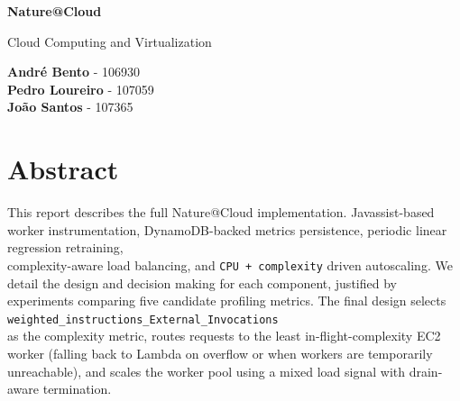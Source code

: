\documentclass[10pt]{article}
\begin{document}
\begin{titlepage}
	\centering
	\vspace*{1.6cm}
	{\LARGE \textbf{Nature@Cloud}\par}
	\vspace{0.8cm}
	{\large Cloud Computing and Virtualization\par}
	\vspace{1.2cm}

	{\large
		\textbf{André Bento} - 106930\\
		\textbf{Pedro Loureiro} - 107059\\
		\textbf{João Santos} - 107365
		\par}

	\vspace{1.2cm}

\end{titlepage}
\twocolumn[
	\begin{@twocolumnfalse}
		\small
	\end{@twocolumnfalse}
]

\section*{\centering Abstract}
This report describes the full Nature@Cloud implementation. Javassist-based
worker instrumentation, DynamoDB-backed metrics persistence, periodic linear
regression retraining, \\ complexity-aware load balancing, and \texttt{CPU +
	complexity} driven autoscaling. We detail the design and decision making for
each component, justified by experiments comparing five candidate profiling
metrics. The final design selects
\texttt{weighted\_instructions\_External\_Invocations} \\ as the complexity
metric, routes requests to the least in-flight-complexity EC2 worker (falling
back to Lambda on overflow or when workers are temporarily unreachable), and
scales the worker pool using a mixed load signal with drain-aware termination.
\vspace{0.6em}

\end{document}
